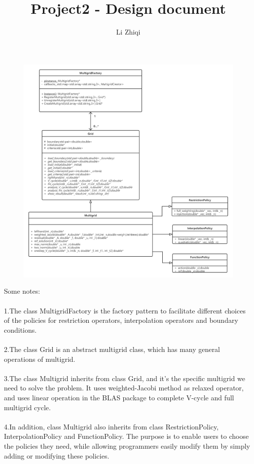 \documentclass[a4paper,,twocolumn]{article}
\title{Project2 - Design document}
\author{Li Zhiqi\quad3180103041}
\theoremstyle{definition}
\begin{document}
\onecolumn
\maketitle
\begin{figure}[!htp]   
	\centering
	\includegraphics[width=17cm]{Pictures/Design_diagram.png}
\end{figure}
\newpage
\twocolumn
\balance
\noindent Some notes:\\\\
1.The class MultigridFactory is the factory pattern to
facilitate different choices of the policies for restriction operators,  interpolation operators and boundary conditions.\\\\
2.The class Grid is an abstract multigrid class, which has many general operations of multigrid.\\\\
3.The class Multigrid inherits from class Grid, and it's the specific multigrid we need to solve the problem. It uses weighted-Jacobi method as relaxed operator, and uses linear operation in the BLAS package to complete V-cycle and full multigrid cycle.\\\\
4.In addition, class Multigrid also inherits from class RestrictionPolicy, InterpolationPolicy and FunctionPolicy. The purpose is to enable users to choose the policies they need, while allowing programmers easily modify them by simply adding or modifying these policies.
\end{document}
